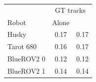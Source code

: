\begin{tabular}{lcc}
\toprule
 & \multicolumn{2}{c}{GT tracks} \\
Robot & Alone & \avatar{} \\
\midrule
Husky & 0.17 & 0.17 \\
Tarot 680 & 0.16 & 0.17 \\
BlueROV2 0 & 0.12 & 0.12 \\
BlueROV2 1 & 0.14 & 0.14 \\
\bottomrule
\end{tabular}
